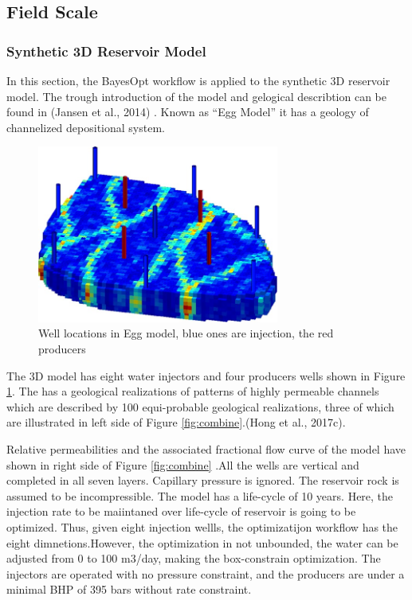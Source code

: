 \documentclass[]{elsarticle} %
\begin{document}
\newpage

\hypertarget{field-scale}{%
\subsection{Field Scale}\label{field-scale}}

\hypertarget{synthetic-3d-reservoir-model}{%
\subsubsection{Synthetic 3D Reservoir Model}\label{synthetic-3d-reservoir-model}}

In this section, the BayesOpt workflow is applied to the synthetic 3D reservoir model. The trough introduction of the model and gelogical describtion can be found in (Jansen et al., 2014) . Known as ``Egg Model'' it has a geology of channelized depositional system.

\begin{figure}

{\centering \includegraphics[width=300px]{img/egg_base} 

}

\caption{Well locations in Egg model, blue ones are injection, the red producers}\label{fig:eggbase}
\end{figure}

The 3D model has eight water injectors and four producers wells shown in Figure \ref{fig:eggbase}. The has a geological realizations of patterns of highly permeable channels which are described by 100 equi-probable geological realizations, three of which are illustrated in left side of Figure \ref{fig:combine}.(Hong et al., 2017c).

Relative permeabilities and the associated fractional flow curve of the model have shown in right side of Figure \ref{fig:combine} .All the wells are vertical and completed in all seven layers. Capillary pressure is ignored. The reservoir rock is assumed to be incompressible. The model has a life-cycle of 10 years. Here, the injection rate to be maiintaned over life-cycle of reservoir is going to be optimized. Thus, given eight injection wellls, the optimizatijon workflow has the eight dimnetions.However, the optimization in not unbounded, the water can be adjusted from 0 to 100 m3/day, making the box-constrain optimization. The injectors are operated with no pressure constraint, and the producers are under a minimal BHP of 395 bars without rate constraint.
\end{document}
